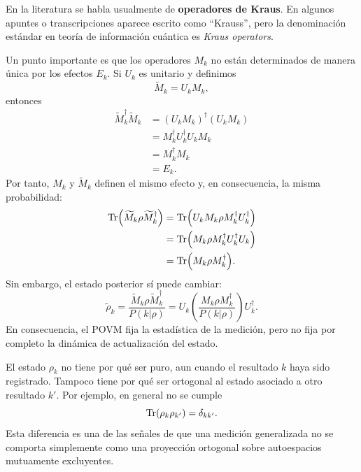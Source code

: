 \documentclass[../main.tex]{subfiles}
\begin{document}
\begin{observacion}
En la literatura se habla usualmente de \textbf{operadores de Kraus}. En algunos apuntes o transcripciones aparece escrito como ``Krauss'', pero la denominación estándar en teoría de información cuántica es \emph{Kraus operators}.
\end{observacion}

Un punto importante es que los operadores $M_k$ no están determinados de manera única por los efectos $E_k$. Si $U_k$ es unitario y definimos
\begin{equation*}
    \widetilde M_k=U_kM_k,
\end{equation*}
entonces
\begin{align*}
    \widetilde M_k^\dagger\widetilde M_k
    &=(U_kM_k)^\dagger(U_kM_k)\\
    &=M_k^\dagger U_k^\dagger U_kM_k\\
    &=M_k^\dagger M_k\\
    &=E_k.
\end{align*}
Por tanto, $M_k$ y $\widetilde M_k$ definen el mismo efecto y, en consecuencia, la misma probabilidad:
\begin{align*}
    \Tr(\widetilde M_k\rho\widetilde M_k^\dagger)
    &=\Tr(U_kM_k\rho M_k^\dagger U_k^\dagger)\\
    &=\Tr(M_k\rho M_k^\dagger U_k^\dagger U_k)\\
    &=\Tr(M_k\rho M_k^\dagger).
\end{align*}
Sin embargo, el estado posterior sí puede cambiar:
\begin{equation*}
    \widetilde\rho_k
    =
    \frac{\widetilde M_k\rho\widetilde M_k^\dagger}{P(k|\rho)}
    =
    U_k
    \left(
    \frac{M_k\rho M_k^\dagger}{P(k|\rho)}
    \right)
    U_k^\dagger.
\end{equation*}
En consecuencia, el POVM fija la estadística de la medición, pero no fija por completo la dinámica de actualización del estado.

\begin{observacion}
El estado $\rho_k$ no tiene por qué ser puro, aun cuando el resultado $k$ haya sido registrado. Tampoco tiene por qué ser ortogonal al estado asociado a otro resultado $k'$. Por ejemplo, en general no se cumple
\begin{equation*}
    \Tr(\rho_k\rho_{k'})=\delta_{kk'}.
\end{equation*}
Esta diferencia es una de las señales de que una medición generalizada no se comporta simplemente como una proyección ortogonal sobre autoespacios mutuamente excluyentes.
\end{observacion}
\end{document}
